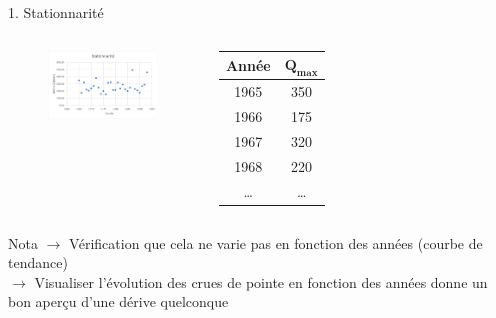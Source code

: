 \documentclass{beamer}
\begin{document}
\begin{frame}{1. Stationnarité}
    \begin{columns}
        \begin{figure}
            \centering
            \includegraphics[width=5cm]{stationnarite.png}
        \end{figure}
        \begin{tabular}{c|c}
            \toprule
            \textbf{Année} & $\mathbf{Q_{max}}$ \\
            \midrule
            1965 & 350 \\
            1966 & 175 \\
            1967 & 320 \\
            1968 & 220 \\
            \dots & \dots \\
            \bottomrule
        \end{tabular}        
    \end{columns}
    \begin{exampleblock}{Nota}
        $\rightarrow$ Vérification que cela ne varie pas en fonction des années (courbe de tendance) \\
        $\rightarrow$ Visualiser l'évolution des crues de pointe en fonction des années donne un bon aperçu d'une dérive quelconque
    \end{exampleblock}
\end{frame}
\end{document}
